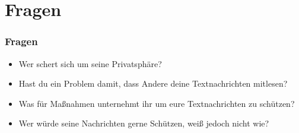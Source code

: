 \section*{Fragen}

\begin{frame}
  \frametitle{Fragen}

  \begin{itemize}
   \item Wer schert sich um seine Privatsphäre?
   \item Hast du ein Problem damit, dass Andere deine Textnachrichten mitlesen?
   \item Was für Maßnahmen unternehmt ihr um eure Textnachrichten zu schützen?
   \item Wer würde seine Nachrichten gerne Schützen, weiß jedoch nicht wie?
  \end{itemize}

\end{frame}

